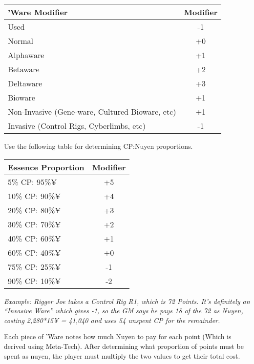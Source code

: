 \begin{multicols*}{3}
	\begin{center}
		\begin{tabularx}{0.50\textwidth}{|X|c|}
			\hline
			\textbf{'Ware Modifier} & \textbf{Modifier}\\
			\hline \hline
			Used & -1\\
			Normal & +0\\
			\hline
			Alphaware & +1\\
			Betaware & +2\\
			Deltaware & +3\\
			\hline
			Bioware & +1\\
			\hline
			Non-Invasive (Gene-ware, Cultured Bioware, etc) & +1\\
			Invasive (Control Rigs, Cyberlimbs, etc) & -1\\
			\hline
		\end{tabularx}
	\end{center}
	
	Use the following table for determining CP:Nuyen proportions.
	
	\begin{center}
		\begin{tabularx}{0.32\textwidth}{|X|c|}
			\hline
			\textbf{Essence Proportion} & \textbf{Modifier}\\
			\hline \hline
			5\% CP: 95\%¥ & +5\\
			\hline
			10\% CP: 90\%¥ & +4\\
			\hline
			20\% CP: 80\%¥ & +3\\
			\hline
			30\% CP: 70\%¥ & +2\\
			\hline
			40\% CP: 60\%¥ & +1\\
			\hline
			60\% CP: 40\%¥ & +0\\
			\hline
			75\% CP: 25\%¥ & -1\\
			\hline
			90\% CP: 10\%¥ & -2\\
			\hline
		\end{tabularx}
	\end{center}
	
	\textit{\textcolor{OliveGreen}{Example: Rigger Joe takes a Control Rig R1, which is 72 Points. It’s definitely an “Invasive Ware” which gives -1, so the GM says he pays 18 of the 72 as Nuyen, costing 2,280*15¥ = 41,040 and uses 54 unspent CP for the remainder. }}
	
	Each piece of 'Ware notes how much Nuyen to pay for each point (Which is derived using \GURPS Meta-Tech). After determining what proportion of points must be spent as nuyen, the player must multiply the two values to get their total cost.
	

\end{multicols*}
